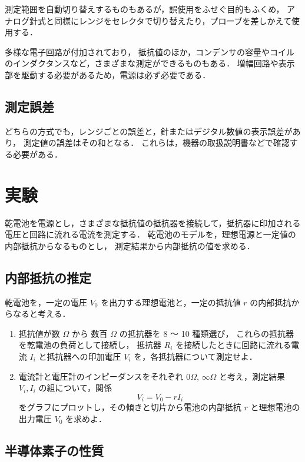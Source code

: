 \documentclass[11pt,sort]{jarticle}
\begin{document}
測定範囲を自動切り替えするものもあるが，誤使用をふせぐ目的もふくめ，
アナログ針式と同様にレンジをセレクタで切り替えたり，プローブを差しかえて使用する．

多様な電子回路が付加されており，
抵抗値のほか，コンデンサの容量やコイルのインダクタンスなど，さまざまな測定ができるものもある．
増幅回路や表示部を駆動する必要があるため，電源は必ず必要である．

\subsection{測定誤差}

どちらの方式でも，レンジごとの誤差と，針またはデジタル数値の表示誤差があり，
測定値の誤差はその和となる．
これらは，機器の取扱説明書などで確認する必要がある．

\newpage
\section{実験}

乾電池を電源とし，さまざまな抵抗値の抵抗器を接続して，抵抗器に印加される電圧と回路に流れる電流を測定する．
乾電池のモデルを，理想電源と一定値の内部抵抗からなるものとし，
測定結果から内部抵抗の値を求める．

\subsection{内部抵抗の推定}\label{a}

乾電池を，一定の電圧 $V_0$ を出力する理想電池と，一定の抵抗値 $r$ の内部抵抗からなると考える．

\begin{enumerate}
\item
抵抗値が数 $\Omega$ から 数百 $\Omega$ の抵抗器を 8 〜 10 種類選び，
これらの抵抗器を乾電池の負荷として接続し，
抵抗器 $R_i$ を接続したときに回路に流れる電流 $I_i$ と抵抗器への印加電圧 $V_i$ を，各抵抗器について測定せよ．
\item
電流計と電圧計のインピーダンスをそれぞれ $0 \Omega$, $\infty \Omega$ と考え，測定結果 $V_i, I_i$ の組について，関係
\[
V_i = V_0 - r I_i
\]
をグラフにプロットし，その傾きと切片から電池の内部抵抗 $r$ と理想電池の出力電圧 $V_0$ を求めよ．
\end{enumerate}


\subsection{半導体素子の性質}\label{b}
\end{document}
